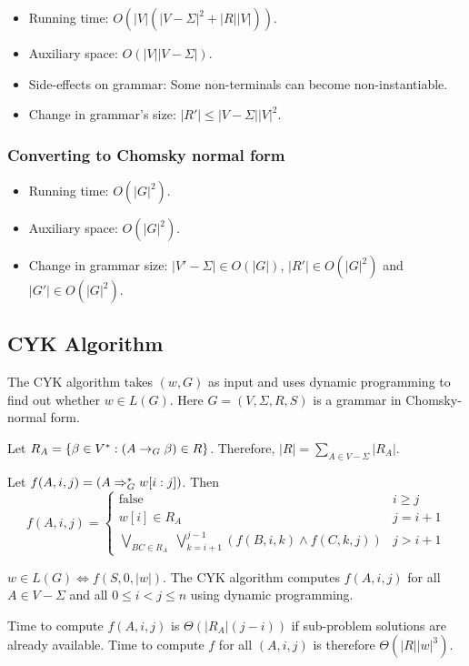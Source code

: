 \begin{itemize}
\item Running time: $O(|V|(|V-\Sigma|^2 + |R||V|))$.
\item Auxiliary space: $O(|V||V-\Sigma|)$.
\item Side-effects on grammar: Some non-terminals can become non-instantiable.
\item Change in grammar's size: $|R'| \le |V-\Sigma||V|^2$.
\end{itemize}

\subsubsection{Converting to Chomsky normal form}

\begin{itemize}
\item Running time: $O(|G|^2)$.
\item Auxiliary space: $O(|G|^2)$.
\item Change in grammar size: $|V'-\Sigma| \in O(|G|)$, $|R'| \in O(|G|^2)$ and $|G'| \in O(|G|^2)$.
\end{itemize}

\subsection{CYK Algorithm}

The CYK algorithm takes $(w, G)$ as input and uses dynamic programming to find out whether $w \in L(G)$.
Here $G = (V, \Sigma, R, S)$ is a grammar in Chomsky-normal form.

Let $R_A = \{\beta \in V^*: (A \rightarrow_{G} \beta) \in R\}$.
Therefore, $|R| = \sum_{A \in V-\Sigma} |R_A|$.

Let $f(A, i, j) = (A \Rightarrow_{G}^* w[i:j])$. Then
\[ f(A, i, j) = \left\{\begin{array}{cl}
\textrm{false} & i \ge j
\\ w[i] \in R_A & j = i+1
\\ \displaystyle \bigvee\limits_{BC \in R_A} \; \bigvee\limits_{k=i+1}^{j-1}
    (f(B, i, k) \wedge f(C, k, j)) & j > i+1
\end{array}\right. \]

$w \in L(G) \iff f(S, 0, |w|)$.
The CYK algorithm computes $f(A, i, j)$ for all $A \in V-\Sigma$
and all $0 \le i < j \le n$ using dynamic programming.

Time to compute $f(A, i, j)$ is $\Theta(|R_A|(j-i))$
if sub-problem solutions are already available.
Time to compute $f$ for all $(A, i, j)$ is therefore $\Theta(|R||w|^3)$.

